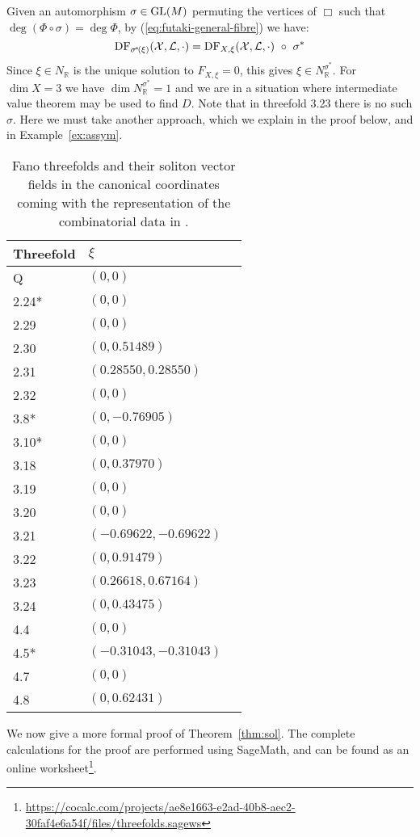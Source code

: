 Given an automorphism \(\sigma \in \operatorname{GL}(M)\) permuting the vertices of \(\Box\) such that \(\deg (\Phi \circ \sigma) = \deg \Phi\), by (\ref{eq:futaki-general-fibre}) we have:
\[
\mathop{\rm DF}\nolimits_{\sigma^{\!*}\!(\xi)} ({\mathcal{X}},\mathcal{L},\cdot) =  \mathop{\rm DF}\nolimits_{X, \xi}({\mathcal{X}},\mathcal{L},\cdot) \ \circ \ \sigma^*
\]
Since \(\xi \in N_\mathbb{R}\) is the unique solution to \(F_{X,\xi} = 0\), this gives \(\xi \in N_{\mathbb{R}}^{\sigma^*}\). For \(\dim X = 3\) we have \(\dim N_{\mathbb{R}}^{\sigma^*}  = 1\) and we are in a situation where intermediate value theorem may be used to find \(D\). Note that in threefold 3.23 there is no such \(\sigma\). Here we must take another approach, which we explain in the proof below, and in Example~\ref{ex:assym}.
%
%
%
\begin{table}[H]  \centering
\captionsetup{width=.95\linewidth}
\caption{Fano threefolds and their soliton vector fields in the canonical coordinates coming with the representation of the combinatorial data in \cite{suss2013fano}.}  \label{table:solitontable}
\begin{tabular}{l l l}
\toprule
Threefold & $\xi$ & \\ \hline
Q & $(0,0)$ \\
2.24* & $(0,0)$ \\
2.29 & $(0,0)$ \\
2.30 & $(0,0.51489)$ \\
2.31 & $(0.28550,0.28550)$\\
2.32 & $(0,0)$ \\
3.8* & $(0,-0.76905)$ \\
3.10* & $(0,0)$ \\
3.18 & $(0,0.37970)$ \\
3.19 & $(0,0)$ \\
3.20 & $(0,0)$ \\
3.21 & $(-0.69622,-0.69622)$ \\
3.22 & $(0,0.91479)$ \\
3.23 & $(0.26618,  0.67164)$ \\
3.24 & $(0,0.43475)$ \\
4.4 &  $(0,0)$ \\
4.5* &  $(-0.31043,-0.31043)$ \\
4.7 &  $(0,0)$ \\
4.8 &  $(0,0.62431)$ \\
\bottomrule
\end{tabular}
\label{table:name}
\end{table}
We now give a more formal proof of Theorem~\ref{thm:sol}. The complete calculations for the proof are performed using SageMath, and can be found as an online worksheet\footnote{\url{https://cocalc.com/projects/ae8e1663-e2ad-40b8-aec2-30faf4e6a54f/files/threefolds.sagews}}.

